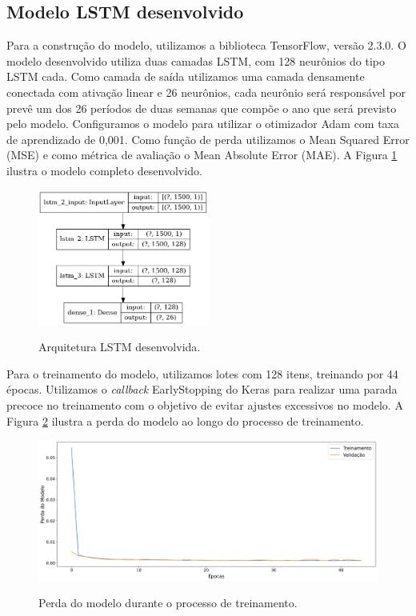 \subsection{Modelo LSTM desenvolvido}

Para a construção do modelo, utilizamos a biblioteca TensorFlow, versão 2.3.0. O modelo desenvolvido utiliza duas camadas LSTM, com 128 neurônios do tipo LSTM cada. Como camada de saída utilizamos uma camada densamente conectada com  ativação linear e 26 neurônios, cada neurônio será responsável por prevê um dos 26 períodos de duas semanas que compõe o ano que será previsto pelo modelo. Configuramos o modelo para utilizar o otimizador Adam com taxa de aprendizado de 0,001. Como função de perda utilizamos o Mean Squared Error (MSE) e como métrica de avaliação o Mean Absolute Error (MAE). A Figura \ref{fig:modelo_lstm} ilustra o modelo completo desenvolvido. 

\begin{figure}[H]
\centering
\caption{Arquitetura LSTM desenvolvida.}
\includegraphics[width=0.5\textwidth]{figuras/lstm_model.png}
\label{fig:modelo_lstm}
\end{figure}

Para o treinamento do modelo, utilizamos lotes com 128 itens, treinando por 44 épocas. Utilizamos o \textit{callback} EarlyStopping do Keras para realizar uma parada precoce no treinamento com o objetivo de evitar ajustes excessivos no modelo. A Figura \ref{fig:perda_modelo} ilustra a perda do modelo ao longo do processo de treinamento. 

\begin{figure}[H]
\centering
\caption{Perda do modelo durante o processo de treinamento.}
\includegraphics[width=\textwidth]{figuras/grafico_de_perda.png}
\label{fig:perda_modelo}
\end{figure}

\renewcommand{\cleardoublepage}{}
\renewcommand{\clearpage}{}
\vspace{5mm}